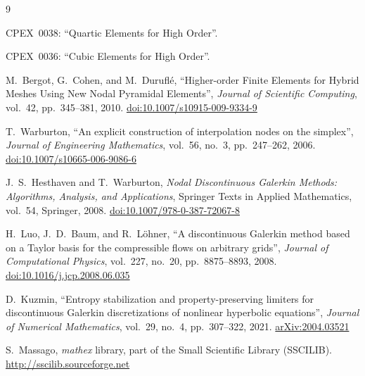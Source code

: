 \documentclass[11pt,letterpaper]{article}
\begin{document}
\begin{thebibliography}{9}

  CPEX~0038: ``Quartic Elements for High Order''.

  CPEX~0036: ``Cubic Elements for High Order''.

  M.\ Bergot, G.\ Cohen, and M.\ Durufl\'e,
  ``Higher-order Finite Elements for Hybrid Meshes Using New Nodal Pyramidal Elements'',
  \textit{Journal of Scientific Computing}, vol.~42, pp.~345--381, 2010.
  \href{https://doi.org/10.1007/s10915-009-9334-9}{doi:10.1007/s10915-009-9334-9}

  T.\ Warburton,
  ``An explicit construction of interpolation nodes on the simplex'',
  \textit{Journal of Engineering Mathematics}, vol.~56, no.~3, pp.~247--262, 2006.
  \href{https://doi.org/10.1007/s10665-006-9086-6}{doi:10.1007/s10665-006-9086-6}

  J.\ S.\ Hesthaven and T.\ Warburton,
  \textit{Nodal Discontinuous Galerkin Methods: Algorithms, Analysis, and Applications},
  Springer Texts in Applied Mathematics, vol.~54, Springer, 2008.
  \href{https://doi.org/10.1007/978-0-387-72067-8}{doi:10.1007/978-0-387-72067-8}

  H.\ Luo, J.\ D.\ Baum, and R.\ L\"ohner,
  ``A discontinuous Galerkin method based on a Taylor basis for the compressible
  flows on arbitrary grids'',
  \textit{Journal of Computational Physics}, vol.~227, no.~20, pp.~8875--8893, 2008.
  \href{https://doi.org/10.1016/j.jcp.2008.06.035}{doi:10.1016/j.jcp.2008.06.035}

  D.\ Kuzmin,
  ``Entropy stabilization and property-preserving limiters for discontinuous
  Galerkin discretizations of nonlinear hyperbolic equations'',
  \textit{Journal of Numerical Mathematics}, vol.~29, no.~4, pp.~307--322, 2021.
  \href{https://arxiv.org/abs/2004.03521}{arXiv:2004.03521}

  S.\ Massago, \textit{mathex} library, part of the Small Scientific Library (SSCILIB).
  \url{http://sscilib.sourceforge.net}

\end{thebibliography}
\end{document}
